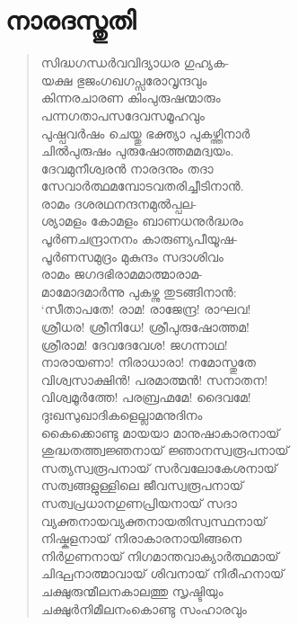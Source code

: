 
\section{നാരദസ്തുതി}

\begin{verse}
സിദ്ധഗന്ധര്‍വവിദ്യാധര ഗുഹ്യക-\\
യക്ഷ ഭുജംഗഖഗപ്സരോവൃന്ദവും\\
കിന്നരചാരണ കിംപുരുഷന്മാരും\\
പന്നഗതാപസദേവസമൂഹവും\\
പുഷ്പവര്‍ഷം ചെയ്തു ഭക്ത്യാ പുകഴ്ത്തിനാര്‍\\
ചില്‍പുരുഷം പുരുഷോത്തമമദ്വയം.\\
ദേവമുനീശ്വരന്‍ നാരദനും തദാ\\
സേവാര്‍ത്ഥമമ്പോടവതരിച്ചീടിനാന്‍.\\
രാമം ദശരഥനന്ദനമുല്‍പ്പല-\\
ശ്യാമളം കോമളം ബാണധനുര്‍ദ്ധരം\\
പൂര്‍ണചന്ദ്രാനനം കാരുണ്യപീയൂഷ-\\
പൂര്‍ണസമുദ്രം മുകുന്ദം സദാശിവം\\
രാമം ജഗദഭിരാമമാത്മാരാമ-\\
മാമോദമാര്‍ന്നു പുകഴ്ന്നു തുടങ്ങിനാന്‍:\\
‘സീതാപതേ! രാമ! രാജേന്ദ്ര! രാഘവ!\\
ശ്രീധര! ശ്രീനിധേ! ശ്രീപുരുഷോത്തമ!\\
ശ്രീരാമ! ദേവദേവേശ! ജഗന്നാഥ!\\
നാരായണാ! നിരാധാരാ! നമോസ്തുതേ\\
വിശ്വസാക്ഷിന്‍! പരമാത്മന്‍! സനാതന!\\
വിശ്വമൂര്‍ത്തേ! പരബ്രഹ്മമേ! ദൈവമേ!\\
ദുഃഖസുഖാദികളെല്ലാമനുദിനം\\
കൈക്കൊണ്ടു മായയാ മാനുഷാകാരനായ്\\
ശുദ്ധതത്ത്വജ്ഞനായ് ജ്ഞാനസ്വരൂപനായ്\\
സത്യസ്വരൂപനായ് സര്‍വലോകേശനായ്\\
സത്വങ്ങളുള്ളിലെ ജീവസ്വരൂപനായ്\\
സത്വപ്രധാനഗുണപ്രിയനായ് സദാ\\
വ്യക്തനായവ്യക്തനായതിസ്വസ്ഥനായ്\\
നിഷ്കളനായ് നിരാകാരനായിങ്ങനെ\\
നിര്‍ഗുണനായ് നിഗമാന്തവാക്യാര്‍ത്ഥമായ്\\
ചിദ്ഘനാത്മാവായ് ശിവനായ് നിരീഹനായ്\\
ചക്ഷുരുന്മീലനകാലത്തു സൃഷ്ടിയും\\
ചക്ഷുര്‍നിമീലനംകൊണ്ടു സംഹാരവും\\

\end{verse}
